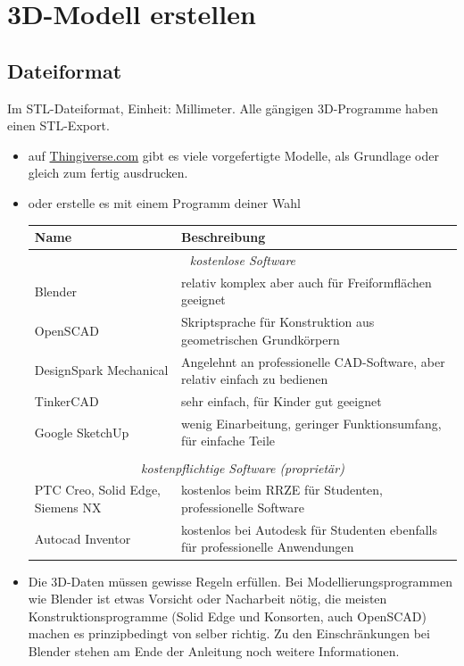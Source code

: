 \documentclass{\basedir/fablab-document}
\begin{document}

\renewcommand{\contentsname}{Inhaltsverzeichnis / Arbeitsablauf}
\setcounter{tocdepth}{2}
\tableofcontents
\newpage

\section{3D-Modell erstellen}
\subsection{Dateiformat}

Im STL-Dateiformat, Einheit: Millimeter. Alle gängigen 3D-Programme haben einen STL-Export.

\begin{itemize}
\item auf \href{https://thingiverse.com}{Thingiverse.com} gibt es viele vorgefertigte Modelle, als
Grundlage oder gleich zum fertig ausdrucken.
\item oder erstelle es mit einem Programm deiner Wahl
\begin{table}[H]
\centering
\begin{tabularx}{\textwidth}{|l|X|}
\hline \textbf{Name} & \textbf{Beschreibung} \\
\hline \multicolumn{2}{|c|}{\textit{kostenlose Software}}  \\
\hline Blender & relativ komplex aber auch für Freiformflächen geeignet  \\
\hline OpenSCAD & Skriptsprache für Konstruktion aus geometrischen Grundkörpern \\
\hline DesignSpark Mechanical & Angelehnt an professionelle CAD-Software, aber relativ einfach zu bedienen  \\
\hline TinkerCAD & sehr einfach, für Kinder gut geeignet  \\
\hline Google SketchUp & wenig Einarbeitung, geringer Funktionsumfang, für einfache Teile \\
\hline & \\
\hline \multicolumn{2}{|c|}{\textit{kostenpflichtige Software (proprietär)}}  \\
\hline PTC Creo, Solid Edge, Siemens NX & kostenlos beim RRZE für Studenten, professionelle Software \\
\hline Autocad Inventor & kostenlos bei Autodesk für Studenten ebenfalls für professionelle Anwendungen \\
\hline 
\end{tabularx} 
\end{table}
\item Die 3D-Daten müssen gewisse Regeln erfüllen. Bei Modellierungsprogrammen wie Blender ist etwas Vorsicht oder Nacharbeit nötig, die meisten Konstruktionsprogramme (Solid Edge und Konsorten, auch OpenSCAD) machen es prinzipbedingt von selber richtig. Zu den Einschränkungen bei Blender stehen am Ende der Anleitung noch weitere Informationen.
\end{itemize}
\end{document}
